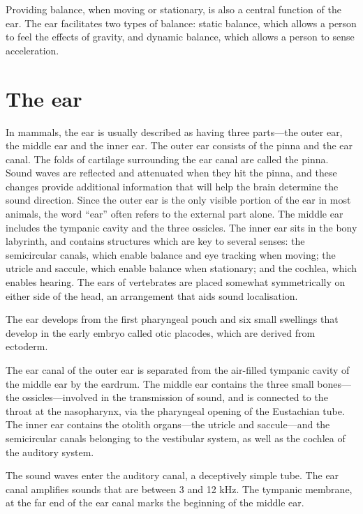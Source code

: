 \documentclass[]{book}
\begin{document}
Providing balance, when moving or stationary, is also a central function of the ear. The ear facilitates two types of balance: static balance, which allows a person to feel the effects of gravity, and dynamic balance, which allows a person to sense acceleration.

\hypertarget{the-ear}{%
\section{The ear}\label{the-ear}}

In mammals, the ear is usually described as having three parts---the outer ear, the middle ear and the inner ear. The outer ear consists of the pinna and the ear canal. The folds of cartilage surrounding the ear canal are called the pinna. Sound waves are reflected and attenuated when they hit the pinna, and these changes provide additional information that will help the brain determine the sound direction. Since the outer ear is the only visible portion of the ear in most animals, the word ``ear'' often refers to the external part alone. The middle ear includes the tympanic cavity and the three ossicles. The inner ear sits in the bony labyrinth, and contains structures which are key to several senses: the semicircular canals, which enable balance and eye tracking when moving; the utricle and saccule, which enable balance when stationary; and the cochlea, which enables hearing. The ears of vertebrates are placed somewhat symmetrically on either side of the head, an arrangement that aids sound localisation.

The ear develops from the first pharyngeal pouch and six small swellings that develop in the early embryo called otic placodes, which are derived from ectoderm.

The ear canal of the outer ear is separated from the air-filled tympanic cavity of the middle ear by the eardrum. The middle ear contains the three small bones---the ossicles---involved in the transmission of sound, and is connected to the throat at the nasopharynx, via the pharyngeal opening of the Eustachian tube. The inner ear contains the otolith organs---the utricle and saccule---and the semicircular canals belonging to the vestibular system, as well as the cochlea of the auditory system.

The sound waves enter the auditory canal, a deceptively simple tube. The ear canal amplifies sounds that are between 3 and 12 kHz. The tympanic membrane, at the far end of the ear canal marks the beginning of the middle ear.
\end{document}
